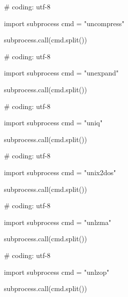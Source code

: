 \begin{mylisting}[label={lst:acpid},language=sh,caption=uncompress]

# coding: utf-8

import subprocess
cmd = "uncompress"

subprocess.call(cmd.split())

\end{mylisting}

\begin{mylisting}[label={lst:acpid},language=sh,caption=unexpand]

# coding: utf-8

import subprocess
cmd = "unexpand"

subprocess.call(cmd.split())

\end{mylisting}

\begin{mylisting}[label={lst:acpid},language=sh,caption=uniq]

# coding: utf-8

import subprocess
cmd = "uniq"

subprocess.call(cmd.split())

\end{mylisting}

\begin{mylisting}[label={lst:acpid},language=sh,caption=unix2dos]

# coding: utf-8

import subprocess
cmd = "unix2dos"

subprocess.call(cmd.split())

\end{mylisting}

\begin{mylisting}[label={lst:acpid},language=sh,caption=unlzma]

# coding: utf-8

import subprocess
cmd = "unlzma"

subprocess.call(cmd.split())

\end{mylisting}

\begin{mylisting}[label={lst:acpid},language=sh,caption=unlzop]

# coding: utf-8

import subprocess
cmd = "unlzop"

subprocess.call(cmd.split())

\end{mylisting}

